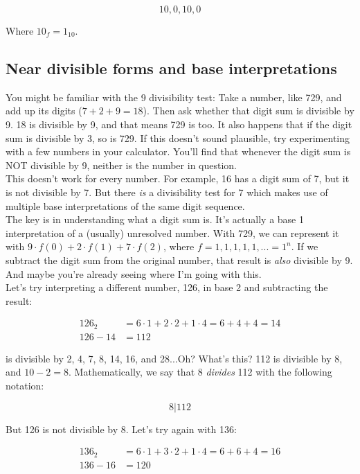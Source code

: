 \documentclass{article}
\begin{document}
$$10, 0, 10, 0$$

\noindent Where $10_f = 1_{10}$.

\subsection*{Near divisible forms and base interpretations}

You might be familiar with the 9 divisibility test: Take a number, like 729, and add up its digits ($7 + 2 + 9 = 18$). Then ask whether that digit sum is divisible by 9. 18 is divisible by 9, and that means 729 is too. It also happens that if the digit sum is divisible by 3, so is 729. If this doesn't sound plausible, try experimenting with a few numbers in your calculator. You'll find that whenever the digit sum is NOT divisible by 9, neither is the number in question.\\

\noindent This doesn't work for every number. For example, 16 has a digit sum of 7, but it is not divisible by 7. But there \textit{is} a divisibility test for 7 which makes use of multiple base interpretations of the same digit sequence.\\

\noindent The key is in understanding what a digit sum is. It's actually a base 1 interpretation of a (usually) unresolved number. With 729, we can represent it with $9 \cdot f(0) + 2 \cdot f(1) + 7 \cdot f(2)$, where $f = 1, 1, 1, 1, 1, ... = 1^n$. If we subtract the digit sum from the original number, that result is \textit{also} divisible by 9. And maybe you're already seeing where I'm going with this.\\

\noindent Let's try interpreting a different number, 126, in base 2 and subtracting the result:

\begin{align*}
126_2 &= 6 \cdot 1 + 2 \cdot 2 + 1 \cdot 4 = 6 + 4 + 4 = 14\\
126 - 14 &= 112
\end{align*}

 is divisible by 2, 4, 7, 8, 14, 16, and 28...Oh? What's this? 112 is divisible by 8, and $10 - 2 = 8$. Mathematically, we say that 8 \textit{divides} 112 with the following notation:

$$8 | 112$$

\noindent But 126 is not divisible by 8. Let's try again with 136:

\begin{align*}
136_2 &= 6 \cdot 1 + 3 \cdot 2 + 1 \cdot 4 = 6 + 6 + 4 = 16\\
136 - 16 &= 120
\end{align*}
\end{document}
